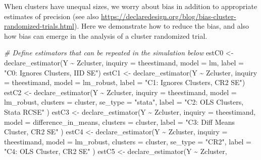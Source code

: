 \documentclass[
  12pt,
]{book}
\newenvironment{Shaded}{\begin{snugshade}}{\end{snugshade}}
\newcommand{\AttributeTok}[1]{\textcolor[rgb]{0.77,0.63,0.00}{#1}}
\newcommand{\CommentTok}[1]{\textcolor[rgb]{0.56,0.35,0.01}{\textit{#1}}}
\newcommand{\FunctionTok}[1]{\textcolor[rgb]{0.00,0.00,0.00}{#1}}
\newcommand{\NormalTok}[1]{#1}
\newcommand{\OtherTok}[1]{\textcolor[rgb]{0.56,0.35,0.01}{#1}}
\newcommand{\SpecialCharTok}[1]{\textcolor[rgb]{0.00,0.00,0.00}{#1}}
\newcommand{\StringTok}[1]{\textcolor[rgb]{0.31,0.60,0.02}{#1}}
\theoremstyle{definition}
\theoremstyle{definition}
\theoremstyle{definition}
\theoremstyle{remark}
\begin{document}
When clusters have unequal sizes, we worry about bias in addition to
appropriate estimates of precision \citep{middleton2015unbiased} (see
also
\url{https://declaredesign.org/blog/bias-cluster-randomized-trials.html}).
Here we demonstrate how to reduce the bias, and also how bias can emerge
in the analysis of a cluster randomized trial.

\begin{Shaded}
\begin{Highlighting}[]
\CommentTok{\# Define estimators that can be repeated in the simulation below}
\NormalTok{estC0 }\OtherTok{\textless{}{-}} \FunctionTok{declare\_estimator}\NormalTok{(Y }\SpecialCharTok{\textasciitilde{}}\NormalTok{ Zcluster, }\AttributeTok{inquiry =}\NormalTok{ theestimand, }\AttributeTok{model =}\NormalTok{ lm, }\AttributeTok{label =} \StringTok{"C0: Ignores Clusters, IID SE"}\NormalTok{)}
\NormalTok{estC1 }\OtherTok{\textless{}{-}} \FunctionTok{declare\_estimator}\NormalTok{(Y }\SpecialCharTok{\textasciitilde{}}\NormalTok{ Zcluster, }\AttributeTok{inquiry =}\NormalTok{ theestimand, }\AttributeTok{model =}\NormalTok{ lm\_robust, }\AttributeTok{label =} \StringTok{"C1: Ignores Clusters, CR2 SE"}\NormalTok{)}
\NormalTok{estC2 }\OtherTok{\textless{}{-}} \FunctionTok{declare\_estimator}\NormalTok{(Y }\SpecialCharTok{\textasciitilde{}}\NormalTok{ Zcluster,}
  \AttributeTok{inquiry =}\NormalTok{ theestimand, }\AttributeTok{model =}\NormalTok{ lm\_robust,}
  \AttributeTok{clusters =}\NormalTok{ cluster, }\AttributeTok{se\_type =} \StringTok{"stata"}\NormalTok{, }\AttributeTok{label =} \StringTok{"C2: OLS Clusters, Stata RCSE"}
\NormalTok{)}
\NormalTok{estC3 }\OtherTok{\textless{}{-}} \FunctionTok{declare\_estimator}\NormalTok{(Y }\SpecialCharTok{\textasciitilde{}}\NormalTok{ Zcluster,}
  \AttributeTok{inquiry =}\NormalTok{ theestimand, }\AttributeTok{model =}\NormalTok{ difference\_in\_means,}
  \AttributeTok{clusters =}\NormalTok{ cluster, }\AttributeTok{label =} \StringTok{"C3: Diff Means Cluster, CR2 SE"}
\NormalTok{)}
\NormalTok{estC4 }\OtherTok{\textless{}{-}} \FunctionTok{declare\_estimator}\NormalTok{(Y }\SpecialCharTok{\textasciitilde{}}\NormalTok{ Zcluster,}
  \AttributeTok{inquiry =}\NormalTok{ theestimand, }\AttributeTok{model =}\NormalTok{ lm\_robust,}
  \AttributeTok{clusters =}\NormalTok{ cluster, }\AttributeTok{se\_type =} \StringTok{"CR2"}\NormalTok{, }\AttributeTok{label =} \StringTok{"C4: OLS Cluster, CR2 SE"}
\NormalTok{)}
\NormalTok{estC5 }\OtherTok{\textless{}{-}} \FunctionTok{declare\_estimator}\NormalTok{(Y }\SpecialCharTok{\textasciitilde{}}\NormalTok{ Zcluster,}

\end{Highlighting}
\end{Shaded}
\end{document}
